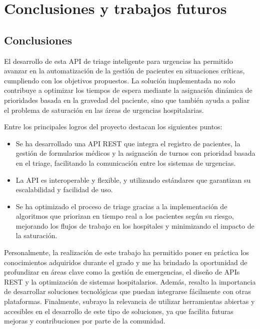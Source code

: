 \chapter{Conclusiones y trabajos futuros}

\section{Conclusiones}

El desarrollo de esta API de triage inteligente para urgencias ha permitido avanzar en la automatización de la gestión de pacientes en situaciones críticas, cumpliendo con los objetivos propuestos.
La solución implementada no solo contribuye a optimizar los tiempos de espera mediante la asignación dinámica de prioridades basada en la gravedad del paciente, sino que también ayuda a paliar el problema de saturación en las áreas de urgencias hospitalarias.

Entre los principales logros del proyecto destacan los siguientes puntos:

\begin{itemize}
    \item Se ha desarrollado una API REST que integra el registro de pacientes, la gestión de formularios médicos y la asignación de turnos con prioridad basada en el triage, facilitando la comunicación entre los sistemas de urgencias.
    \item La API es interoperable y flexible, y utilizando estándares que garantizan su escalabilidad y facilidad de uso.
    \item Se ha optimizado el proceso de triage gracias a la implementación de algoritmos que priorizan en tiempo real a los pacientes según su riesgo, mejorando los flujos de trabajo en los hospitales y minimizando el impacto de la saturación.
\end{itemize}

Personalmente, la realización de este trabajo ha permitido poner en práctica los conocimientos adquiridos durante el grado y me ha brindado la oportunidad de profundizar en áreas clave como la gestión de emergencias, el diseño de APIs REST y la optimización de sistemas hospitalarios.
Además, resalto la importancia de desarrollar soluciones tecnológicas que puedan integrarse fácilmente con otras plataformas.
Finalmente, subrayo la relevancia de utilizar herramientas abiertas y accesibles en el desarrollo de este tipo de soluciones, ya que facilita futuras mejoras y contribuciones por parte de la comunidad.

